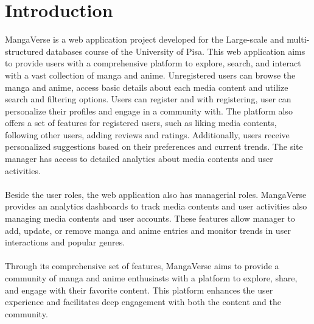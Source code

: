\chapter{Introduction}



MangaVerse is a web application project developed for the Large-scale and multi-structured databases  
course of the University of Pisa. This web application aims to provide users with a 
comprehensive platform to explore, search, and interact with a vast collection of 
manga and anime. Unregistered users can browse the manga and anime, access basic details
about each media content and utilize search and filtering options. Users can register and with
 registering, user can personalize their profiles and engage in a 
community with. The platform also offers a set of features for registered users, such as 
liking media contents, following other users, adding reviews and ratings. Additionally, 
users receive personalized suggestions based on their preferences and current trends. 
The site manager has access to detailed analytics about media contents and user 
activities.\\ \\
Beside the user roles, the web application also has managerial roles. MangaVerse provides
an analytics dashboards to track media contents and user activities also managing media contents and 
user accounts. These features allow manager to add, update, or remove manga and anime entries
and monitor trends in user interactions and popular genres. \\ \\
Through its comprehensive set of features, MangaVerse aims to provide a community of manga 
and anime enthusiasts with a platform to explore, share, and engage with their favorite
 content. This platform enhances the user experience and facilitates deep engagement with 
 both the content and the community.
